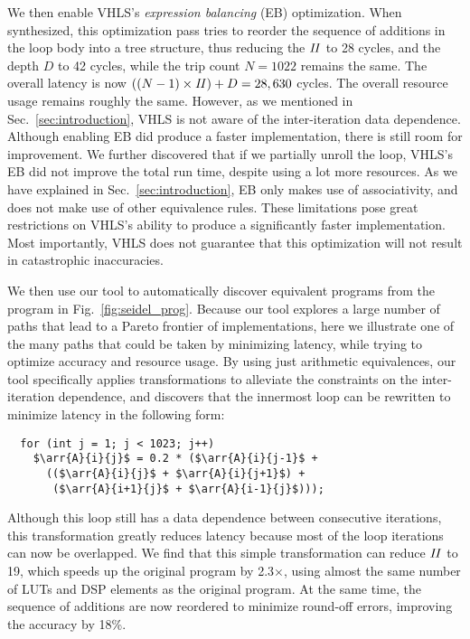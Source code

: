 We then enable VHLS's \emph{expression balancing} (EB) optimization.  When
synthesized, this optimization pass tries to reorder the sequence of additions
in the loop body into a tree structure, thus reducing the $\mathit{II}$ to 28 cycles,
and the depth $D$ to 42 cycles, while the trip count $N = 1022$ remains the
same.  The overall latency is now $((N-1) \times \mathit{II}) + D = 28,630$ cycles.
The overall resource usage remains roughly the same.  However, as we mentioned
in Sec.~\ref{sec:introduction}, VHLS is not aware of the inter-iteration data
dependence.  Although enabling EB did produce a faster implementation, there is
still room for improvement.  We further discovered that if we partially unroll
the loop, VHLS's EB did not improve the total run time, despite using a lot
more resources.  As we have explained in Sec.~\ref{sec:introduction}, EB only
makes use of associativity, and does not make use of other equivalence rules.
These limitations pose great restrictions on VHLS's ability to produce a
significantly faster implementation.  Most importantly, VHLS does not guarantee
that this optimization will not result in catastrophic inaccuracies.

We then use our tool to automatically discover equivalent programs from the
program in Fig.~\ref{fig:seidel_prog}.  Because our tool explores a large
number of paths that lead to a Pareto frontier of implementations, here we
illustrate one of the many paths that could be taken by minimizing latency,
while trying to optimize accuracy and resource usage.  By using just arithmetic
equivalences, our tool specifically applies transformations to alleviate the
constraints on the inter-iteration dependence, and discovers that the innermost
loop can be rewritten to minimize latency in the following form:
%
\begin{lstlisting}
  for (int j = 1; j < 1023; j++)
    $\arr{A}{i}{j}$ = 0.2 * ($\arr{A}{i}{j-1}$ +
      (($\arr{A}{i}{j}$ + $\arr{A}{i}{j+1}$) +
       ($\arr{A}{i+1}{j}$ + $\arr{A}{i-1}{j}$)));
\end{lstlisting}
%
Although this loop still has a data dependence between consecutive iterations,
this transformation greatly reduces latency because most of the loop iterations
can now be overlapped.  We find that this simple transformation can reduce
$\mathit{II}$ to 19, which speeds up the original program by 2.3$\times$, using almost
the same number of LUTs and DSP elements as the original program.  At the same
time, the sequence of additions are now reordered to minimize round-off errors,
improving the accuracy by 18\%.

